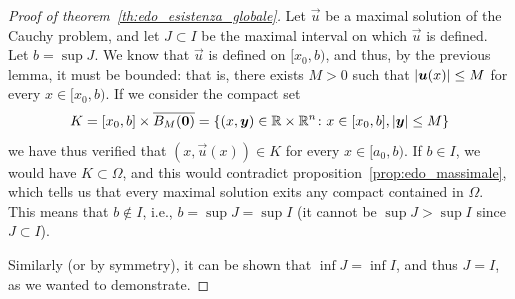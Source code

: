 \begin{proof}[Proof of theorem~\ref{th:edo_esistenza_globale}]
Let $\vec u$ be a maximal solution of the Cauchy problem, and let $J\subset I$
be the maximal interval on which $\vec u$ is defined. Let $b=\sup J$. We know
that $\vec u$ is defined on $[x_0,b)$, and thus, by the previous lemma, it must
be bounded: that is, there exists $M>0$ such that ${\left|\boldsymbol u(x)\right|}\le M$ for
every $x\in[x_0,b)$. If we consider the compact set
\[
K=[x_0,b] \times \overline{B_M(\boldsymbol 0)}
  = {\left\{ (x,\boldsymbol y)\in {\mathbb R} \times {\mathbb R}^n\colon x\in [x_0,b], {\left|\boldsymbol y\right|}\le
 M \right\}}
\]
we have thus verified that $(x,\vec u(x))\in K$ for every $x\in [a_0,b)$. If
$b\in I$, we would have $K\subset \Omega$, and this would contradict
proposition~\ref{prop:edo_massimale}, which tells us that every maximal solution
exits any compact contained in $\Omega$. This means that $b\not \in I$, i.e., $b
= \sup J = \sup I$ (it cannot be $\sup J>\sup I$ since $J\subset I$).

Similarly (or by symmetry), it can be shown that $\inf J=\inf I$, and thus
$J=I$, as we wanted to demonstrate.
\end{proof}